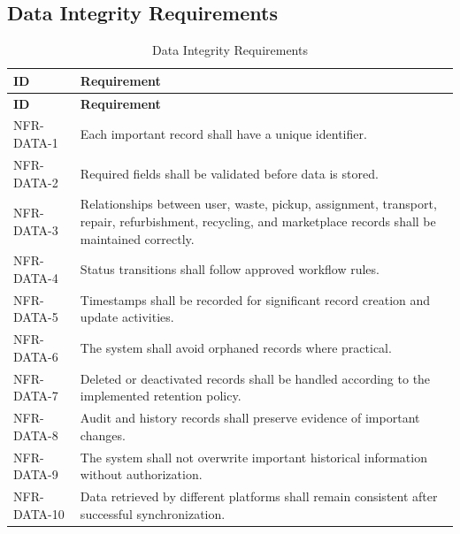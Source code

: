 \subsection{Data Integrity Requirements}
\begin{longtable}{@{}p{2.6cm}p{10.8cm}@{}}
\caption{Data Integrity Requirements} \label{tab:nfr-data} \\
\toprule \textbf{ID} & \textbf{Requirement} \\ \midrule
\endfirsthead
\toprule \textbf{ID} & \textbf{Requirement} \\ \midrule
\endhead
NFR-DATA-1 & Each important record shall have a unique identifier. \\
NFR-DATA-2 & Required fields shall be validated before data is stored. \\
NFR-DATA-3 & Relationships between user, waste, pickup, assignment, transport, repair, refurbishment, recycling, and marketplace records shall be maintained correctly. \\
NFR-DATA-4 & Status transitions shall follow approved workflow rules. \\
NFR-DATA-5 & Timestamps shall be recorded for significant record creation and update activities. \\
NFR-DATA-6 & The system shall avoid orphaned records where practical. \\
NFR-DATA-7 & Deleted or deactivated records shall be handled according to the implemented retention policy. \\
NFR-DATA-8 & Audit and history records shall preserve evidence of important changes. \\
NFR-DATA-9 & The system shall not overwrite important historical information without authorization. \\
NFR-DATA-10 & Data retrieved by different platforms shall remain consistent after successful synchronization. \\
\bottomrule
\end{longtable}

